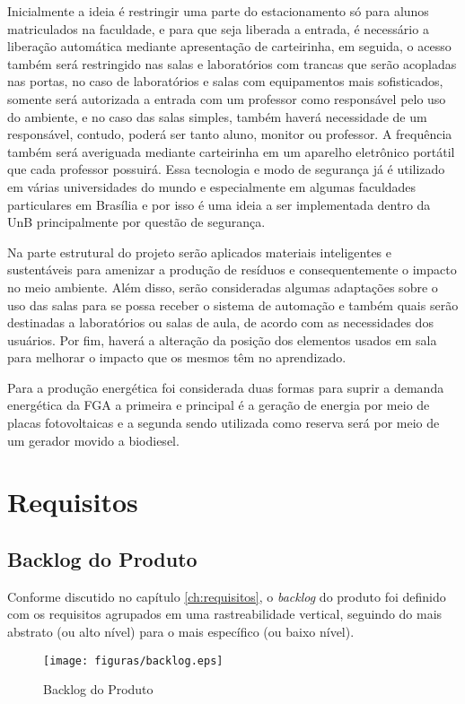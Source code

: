 Inicialmente a ideia é restringir uma parte do estacionamento só para alunos matriculados na faculdade, e para que seja liberada a entrada, é necessário a liberação automática mediante apresentação de carteirinha, em seguida, o acesso também será restringido nas salas e laboratórios com trancas que serão acopladas nas portas, no caso de laboratórios e salas com equipamentos mais sofisticados, somente será autorizada a entrada com um professor como responsável pelo uso do ambiente, e no caso das salas simples, também haverá necessidade de um responsável, contudo, poderá ser tanto aluno, monitor ou professor. A frequência também será averiguada mediante carteirinha em um aparelho eletrônico portátil que cada professor possuirá. Essa tecnologia e modo de segurança já é utilizado em várias universidades do mundo e especialmente em algumas faculdades particulares em Brasília e por isso é uma ideia a ser implementada dentro da UnB principalmente por questão de segurança.

Na parte estrutural do projeto serão aplicados materiais inteligentes e sustentáveis para amenizar a produção de resíduos e consequentemente o impacto no meio ambiente. Além disso, serão consideradas algumas adaptações sobre o uso das salas para se possa receber o sistema de automação e também quais serão destinadas a laboratórios ou salas de aula, de acordo com as necessidades dos usuários. Por fim, haverá a alteração da posição dos elementos usados em sala para melhorar o impacto que os mesmos têm no aprendizado.

Para a produção energética foi considerada duas formas para suprir a demanda energética da FGA a primeira e principal é a geração de energia por meio de placas fotovoltaicas e a segunda sendo utilizada como reserva será por meio de um gerador movido a biodiesel.

\chapter{Requisitos\label{ch:requisitos}}
\section{Backlog do Produto}
Conforme discutido no capítulo \ref{ch:requisitos}, o \textit{backlog} do produto foi definido com os requisitos agrupados em uma rastreabilidade vertical, seguindo do mais abstrato (ou alto nível) para o mais específico (ou baixo nível).

\begin{figure}[!h]
  \centering
  	\texttt{[image: figuras/backlog.eps]}
   \caption{Backlog do Produto\label{fig:backlog}}
\end{figure}

